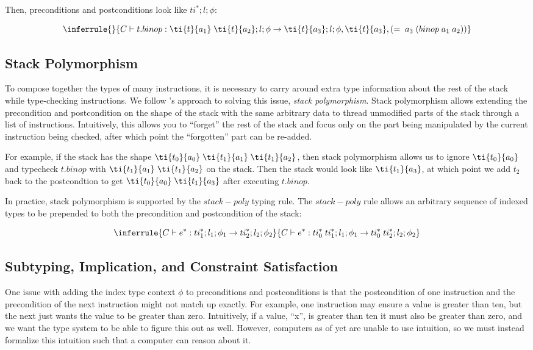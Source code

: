 Then, \name preconditions and postconditions look like $ti^{*}; l; \phi$:

\[
    \inferrule{ }{C \vdash t.binop : \ti{t}{a_1}\; \ti{t}{a_2};l;\phi \rightarrow \ti{t}{a_3};l;\phi,\ti{t}{a_3},(=\; a_3\; (binop\; a_1\; a_2))}
\]

\subsection{Stack Polymorphism}
To compose together the types of many instructions, it is necessary to carry around extra type information about the rest of the stack while type-checking instructions.
We follow \wasm's approach to solving this issue, \emph{stack polymorphism}.
Stack polymorphism allows extending the precondition and postcondition on the shape of the stack with the same arbitrary data to thread unmodified parts of the stack through a list of instructions.
Intuitively, this allows you to ``forget'' the rest of the stack and focus only on the part being manipulated by the current instruction being checked, after which point the ``forgotten'' part can be re-added.

For example, if the stack has the shape $\ti{t_0}{a_0}\; \ti{t_1}{a_1}\; \ti{t_1}{a_2}$, then stack polymorphism allows us to ignore $\ti{t_0}{a_0}$ and typecheck $t.binop$ with $\ti{t_1}{a_1}\; \ti{t_1}{a_2}$ on the stack.
Then the stack would look like $\ti{t_1}{a_3}$, at which point we add $t_2$ back to the postcondtion to get $\ti{t_0}{a_0}\; \ti{t_1}{a_3}$ after executing $t.binop$.

In practice, stack polymorphism is supported by the $stack-poly$ typing rule.
The $stack-poly$ rule allows an arbitrary sequence of indexed types to be prepended to both the precondition and postcondition of the stack:

\[
    \inferrule{C \vdash e^{*} :ti_1^{*};l_1;\phi_1 \rightarrow ti_2^{*};l_2;\phi_2}{C \vdash e^{*} : ti_0^{*}\;ti_1^{*};l_1;\phi_1 \rightarrow ti_0^{*}\;ti_2^{*};l_2;\phi_2}
\]

\subsection{Subtyping, Implication, and Constraint Satisfaction}
One issue with adding the index type context $\phi$ to preconditions and postconditions is that the postcondition of one instruction and the precondition of the next instruction might not match up exactly.
For example, one instruction may ensure a value is greater than ten, but the next just wants the value to be greater than zero.
Intuitively, if a value, ``x'', is greater than ten it must also be greater than zero, and we want the \name type system to be able to figure this out as well.
However, computers as of yet are unable to use intuition, so we must instead formalize this intuition such that a computer can reason about it.

